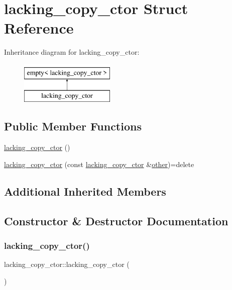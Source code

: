 \hypertarget{structlacking__copy__ctor}{}\section{lacking\+\_\+copy\+\_\+ctor Struct Reference}
\label{structlacking__copy__ctor}
Inheritance diagram for lacking\+\_\+copy\+\_\+ctor\+:\begin{figure}[H]
\begin{center}
\leavevmode
\includegraphics[height=2.000000cm]{structlacking__copy__ctor}
\end{center}
\end{figure}
\subsection*{Public Member Functions}
\begin{DoxyCompactItemize}
\item 
\mbox{\hyperlink{structlacking__copy__ctor_a4d1aa3f5e136c9db993429fae3c57641}{lacking\+\_\+copy\+\_\+ctor}} ()
\item 
\mbox{\hyperlink{structlacking__copy__ctor_a4b177fa9a0bf30531f2ed0c11a0c033a}{lacking\+\_\+copy\+\_\+ctor}} (const \mbox{\hyperlink{structlacking__copy__ctor}{lacking\+\_\+copy\+\_\+ctor}} \&\mbox{\hyperlink{dictobject_8h_abd4733e17e86acb453bda62bc8b96adf}{other}})=delete
\end{DoxyCompactItemize}
\subsection*{Additional Inherited Members}


\subsection{Constructor \& Destructor Documentation}
\mbox{\label{structlacking__copy__ctor_a4d1aa3f5e136c9db993429fae3c57641}} 
\subsubsection{\texorpdfstring{lacking\_copy\_ctor()}{lacking\_copy\_ctor()}\hspace{0.1cm}{\footnotesize\ttfamily [1/2]}}
{\footnotesize\ttfamily lacking\+\_\+copy\+\_\+ctor\+::lacking\+\_\+copy\+\_\+ctor (\begin{DoxyParamCaption}{ }\end{DoxyParamCaption})\hspace{0.3cm}{\ttfamily [inline]}}

